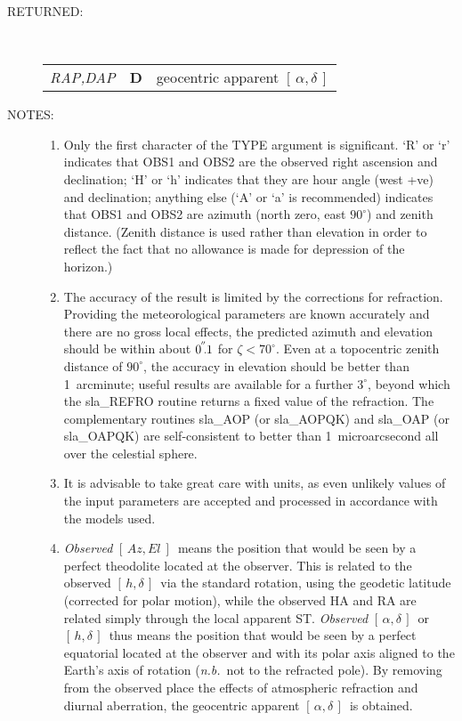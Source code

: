 \documentclass[11pt,twoside]{article}
\newcommand{\radec}     {$[\,\alpha,\delta\,]$}
\newcommand{\hadec}     {$[\,h,\delta\,]$}
\newcommand{\azel}      {$[\,Az,El~]$}
\newcommand{\arcsec}[2] {\arcseci{#1}$\hspace{-0.4em}.#2$}
\newcommand{\arcsec}[2] {
      {$#1\hspace{-0.05em}^{'\hspace{-0.1em}'}\hspace{-0.4em}.#2$}
   }
\newcommand{\arcseci}[1] {$#1\hspace{-0.05em}$\raisebox{-0.5ex}
                         {$^{'\hspace{-0.1em}'}$}}
\renewcommand{\arcseci}[1] {$#1\hspace{-0.05em}^{'\hspace{-0.1em}'}$}
\newlength{\oldspacing}
\newcommand{\args}[2]
{
  \goodbreak
  \setlength{\oldspacing}{\topsep}
  \setlength{\topsep}{0.3ex}
  \begin{description}
  \item[#1]:\\[1.5ex]
    \begin{tabular}{p{7em}p{6em}p{22em}}
      #2
    \end{tabular}
  \end{description}
  \setlength{\topsep}{\oldspacing}
}
\renewcommand{\args}[2]
   {
     \begin{description}
        \item[#1:]\\
        \begin{tabular}{p{7em}p{6em}l}
           #2
        \end{tabular}
     \end{description}
   }
\newcommand{\spec}[3]
{
  {\em {#1}} & {\bf \mbox{#2}} & {#3}
}
\newcommand{\notes}[1]
{
  \goodbreak
  \setlength{\oldspacing}{\topsep}
  \setlength{\topsep}{0.3ex}
  \begin{description}
    \item[NOTES]:
        #1
  \end{description}
  \setlength{\topsep}{\oldspacing}
}
\renewcommand{\notes}[1]
   {
      \begin{description}
         \item[NOTES:]
            #1
      \end{description}
   }
\begin{document}
\args{RETURNED}
{
 \spec{RAP,DAP}{D}{geocentric apparent \radec}
}
\notes
{
 \begin{enumerate}
  \item Only the first character of the TYPE argument is significant.
        `R' or `r' indicates that OBS1 and OBS2 are the observed right
        ascension and declination;  `H' or `h' indicates that they are
        hour angle (west +ve) and declination; anything else (`A' or
        `a' is recommended) indicates that OBS1 and OBS2 are azimuth
        (north zero, east $90^{\circ}$) and zenith distance.  (Zenith
        distance is used rather than elevation in order to reflect the
        fact that no allowance is made for depression of the horizon.)
  \item The accuracy of the result is limited by the corrections for
        refraction.  Providing the meteorological parameters are
        known accurately and there are no gross local effects, the
        predicted azimuth and elevation should be within about
        \arcsec{0}{1} for $\zeta<70^{\circ}$.  Even
        at a topocentric zenith distance of
        $90^{\circ}$, the accuracy in elevation should be better than
        1~arcminute;  useful results are available for a further
        $3^{\circ}$, beyond which the sla\_REFRO routine returns a
        fixed value of the refraction.  The complementary
        routines sla\_AOP (or sla\_AOPQK) and sla\_OAP (or sla\_OAPQK)
        are self-consistent to better than 1~microarcsecond all over
        the celestial sphere.
  \item It is advisable to take great care with units, as even
        unlikely values of the input parameters are accepted and
        processed in accordance with the models used.
  \item {\it Observed}\/ \azel\ means the position that would be seen by a
        perfect theodolite located at the observer.  This is
        related to the observed \hadec\ via the standard rotation, using
        the geodetic latitude (corrected for polar motion), while the
        observed HA and RA are related simply through the local
        apparent ST.  {\it Observed}\/ \radec\ or \hadec\ thus means the
        position that would be seen by a perfect equatorial located
        at the observer and with its polar axis aligned to the
        Earth's axis of rotation ({\it n.b.}\ not to the refracted pole).
        By removing from the observed place the effects of
        atmospheric refraction and diurnal aberration, the
        geocentric apparent \radec\ is obtained.

\end{enumerate}}
\end{document}
